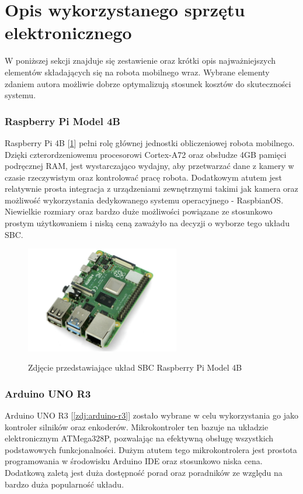 \section{Opis wykorzystanego sprzętu elektronicznego}
W poniższej sekcji znajduje się zestawienie oraz krótki opis najważniejszych elementów składających się na robota mobilnego wraz. Wybrane elementy zdaniem autora możliwie dobrze optymalizują stosunek kosztów do skuteczności systemu. 

\subsubsection*{Raspberry Pi Model 4B}
Raspberry Pi 4B [\ref{zdj:raspi}] pełni rolę głównej jednostki obliczeniowej robota mobilnego. Dzięki czterordzeniowemu procesorowi Cortex-A72 oraz obsłudze 4GB pamięci podręcznej RAM, jest wystarczająco wydajny, aby przetwarzać dane z kamery w czasie rzeczywistym oraz kontrolować pracę robota. Dodatkowym atutem jest relatywnie prosta integracja z urządzeniami zewnętrznymi takimi jak kamera oraz możliwość wykorzystania dedykowanego systemu operacyjnego - RaspbianOS. Niewielkie rozmiary oraz bardzo duże możliwości powiązane ze stosunkowo prostym użytkowaniem i niską ceną zaważyło na decyzji o wyborze tego układu SBC. 

\begin{figure}[h!]
    \centering
    \includegraphics[width=0.6\textwidth]{./graf/raspi-4b.png}
    \label{zdj:raspi}
    \caption{Zdjęcie przedstawiające układ SBC Raspberry Pi Model 4B}
\end{figure}

\subsubsection*{Arduino UNO R3}
Arduino UNO R3 [\ref{zdj:arduino-r3}] zostało wybrane w celu wykorzystania go jako kontroler silników oraz enkoderów. Mikrokontroler ten bazuje na układzie elektronicznym ATMega328P, pozwalając na efektywną obsługę wszystkich podstawowych funkcjonalności. Dużym atutem tego mikrokontrolera jest prostota programowania w środowisku Arduino IDE oraz stosunkowo niska cena. Dodatkową zaletą jest duża dostępność porad oraz poradników ze względu na bardzo duża popularność układu. 

